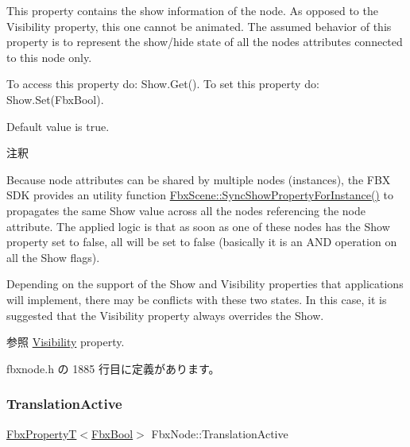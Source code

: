 This property contains the show information of the node. As opposed to the Visibility property, this one cannot be animated. The assumed behavior of this property is to represent the show/hide state of all the nodes attributes connected to this node only.

To access this property do\+: Show.\+Get(). To set this property do\+: Show.\+Set(\+Fbx\+Bool).

Default value is true.

\begin{DoxyRemark}{注釈}
\begin{DoxyItemize}
\item Because node attributes can be shared by multiple nodes (instances), the F\+BX S\+DK provides an utility function \hyperlink{class_fbx_scene_a940444136913f6e50f687ff0807c93e5}{Fbx\+Scene\+::\+Sync\+Show\+Property\+For\+Instance()} to propagates the same Show value across all the nodes referencing the node attribute. The applied logic is that as soon as one of these nodes has the Show property set to {\ttfamily false}, all will be set to {\ttfamily false} (basically it is an A\+ND operation on all the Show flags).\end{DoxyItemize}
\begin{DoxyItemize}
\item Depending on the support of the Show and Visibility properties that applications will implement, there may be conflicts with these two states. In this case, it is suggested that the Visibility property always overrides the Show.\end{DoxyItemize}

\end{DoxyRemark}
\begin{DoxySeeAlso}{参照}
\hyperlink{class_fbx_node_a9f02f0a70b81c1a656137def3e34edb7}{Visibility} property. 
\end{DoxySeeAlso}


 fbxnode.\+h の 1885 行目に定義があります。

\mbox{\label{class_fbx_node_acf5cb5425a24d6e99b19085b93585fcd}} 
\subsubsection{\texorpdfstring{Translation\+Active}{TranslationActive}}
{\footnotesize\ttfamily \hyperlink{class_fbx_property_t}{Fbx\+PropertyT}$<$\hyperlink{fbxtypes_8h_a92e0562b2fe33e76a242f498b362262e}{Fbx\+Bool}$>$ Fbx\+Node\+::\+Translation\+Active}


